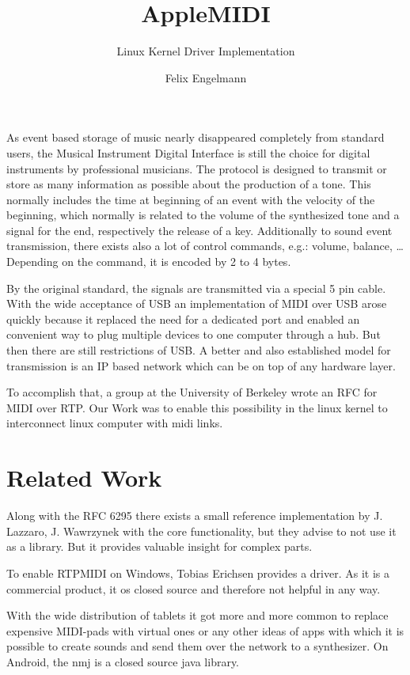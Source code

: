 \documentclass[paper=a4,fontsize=11pt,pagesize,bibtotoc]{scrartcl}
\title{AppleMIDI}
\subtitle{Linux Kernel Driver Implementation}
\author{Felix Engelmann}
\begin{document}
	\maketitle
	
	As event based storage of music nearly disappeared completely from standard users, the 
	Musical Instrument Digital Interface
	is still the choice for digital instruments by professional musicians. The protocol is designed to transmit or store as many information as possible about the production of a tone. This normally includes the time at beginning of an event with the velocity of the beginning, which normally is related to the volume of the synthesized tone and a signal for the end, respectively the release of a key. Additionally to sound event transmission, there exists also a lot of control commands, e.g.: volume, balance, \dots
	Depending on the command, it is encoded by 2 to 4 bytes.
	
	By the original standard, the signals are transmitted via a special 5 pin cable. With the wide acceptance of USB an implementation of MIDI over USB arose quickly because it replaced the need for a dedicated port and enabled an convenient way to plug multiple devices to one computer through a hub. But then there are still restrictions of USB. A better and also established model for transmission is an IP based network which can be on top of any hardware layer.
	
	To accomplish that, a group at the University of Berkeley wrote an RFC for MIDI over RTP. Our Work was to enable this possibility in the linux kernel to interconnect linux computer with midi links.
	
	\section{Related Work}
	Along with the RFC 6295 there exists a small reference implementation by 
	J. Lazzaro, J. Wawrzynek
	with the core functionality, but they advise to not use it as a library. But it provides valuable insight for complex parts.
	
	To enable RTPMIDI on Windows,
	Tobias Erichsen
	provides a driver. As it is a commercial product, it os closed source and therefore not helpful in any way.
	
	With the wide distribution of tablets it got more and more common to replace expensive MIDI-pads with virtual ones or any other ideas of apps with which it is possible to create sounds and send them over the network to a synthesizer. On Android, the nmj is a closed source java library.
	
\end{document}
